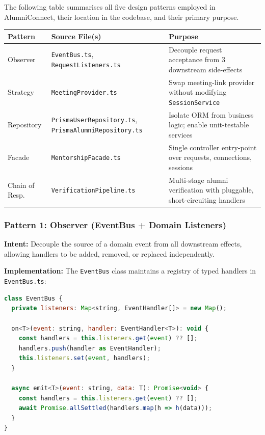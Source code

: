 \documentclass[12pt,a4paper]{article}
\begin{document}
The following table summarises all five design patterns employed in AlumniConnect, their location in the codebase, and their primary purpose.

\begin{center}
\begin{tabular}{@{}p{2.5cm} p{4.8cm} p{5.3cm}@{}}
\toprule
\textbf{Pattern} & \textbf{Source File(s)} & \textbf{Purpose} \\
\midrule
Observer       & \texttt{EventBus.ts}, \texttt{RequestListeners.ts} & Decouple request acceptance from 3 downstream side-effects \\[3pt]
Strategy       & \texttt{MeetingProvider.ts} & Swap meeting-link provider without modifying \texttt{SessionService} \\[3pt]
Repository     & \texttt{PrismaUserRepository.ts}, \texttt{PrismaAlumniRepository.ts} & Isolate ORM from business logic; enable unit-testable services \\[3pt]
Facade         & \texttt{MentorshipFacade.ts} & Single controller entry-point over requests, connections, sessions \\[3pt]
Chain of Resp. & \texttt{VerificationPipeline.ts} & Multi-stage alumni verification with pluggable, short-circuiting handlers \\
\bottomrule
\end{tabular}
\end{center}

\subsubsection{Pattern 1: Observer (EventBus + Domain Listeners)}

\textbf{Intent:} Decouple the source of a domain event from all downstream effects, allowing handlers to be added, removed, or replaced independently.

\textbf{Implementation:} The \texttt{EventBus} class maintains a registry of typed handlers in \texttt{EventBus.ts}:

\begin{lstlisting}[language=JavaScript, caption={EventBus publish-subscribe in TypeScript}]
class EventBus {
  private listeners: Map<string, EventHandler[]> = new Map();

  on<T>(event: string, handler: EventHandler<T>): void {
    const handlers = this.listeners.get(event) ?? [];
    handlers.push(handler as EventHandler);
    this.listeners.set(event, handlers);
  }

  async emit<T>(event: string, data: T): Promise<void> {
    const handlers = this.listeners.get(event) ?? [];
    await Promise.allSettled(handlers.map(h => h(data)));
  }
}
\end{lstlisting}
\end{document}
